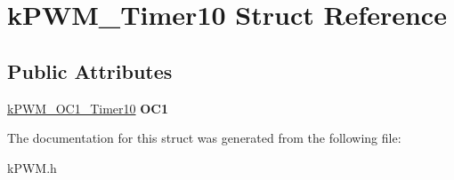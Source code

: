 \hypertarget{structkPWM__Timer10}{}\section{k\+P\+W\+M\+\_\+\+Timer10 Struct Reference}
\label{structkPWM__Timer10}
\subsection*{Public Attributes}
\begin{DoxyCompactItemize}
\item 
\hyperlink{structkPWM__OC1__Timer10}{k\+P\+W\+M\+\_\+\+O\+C1\+\_\+\+Timer10} {\bfseries O\+C1}\hypertarget{structkPWM__Timer10_a017a65f4467820ad89be218cec9b8ad4}{}\label{structkPWM__Timer10_a017a65f4467820ad89be218cec9b8ad4}

\end{DoxyCompactItemize}


The documentation for this struct was generated from the following file\+:\begin{DoxyCompactItemize}
\item 
k\+P\+W\+M.\+h\end{DoxyCompactItemize}
